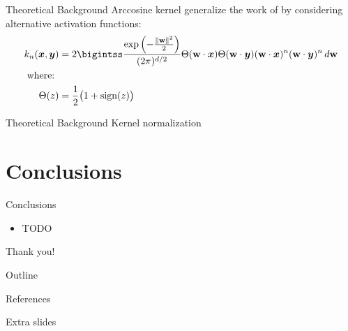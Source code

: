 \documentclass[aspectratio=169]{beamer}
\newcommand{\y}{{\boldsymbol{y}}}
\begin{document}
\begin{frame}{Theoretical Background \textendash{} Arccosine kernel}
	\textcite{choLargemarginClassificationInfinite2010} generalize the work of
	\textcite{williamsComputingInfiniteNetworks1996} by considering alternative activation functions:
	\begin{align*}
		k_n(\boldsymbol x, \y) & = 2 \bigintss \frac{\exp\left(-\frac{\lVert \textbf w \rVert^2}{2}\right)}{(2\pi)^{d/2}}
		\Theta(\textbf w \cdot \boldsymbol x) \Theta(\textbf w \cdot \y) (\textbf w \cdot \boldsymbol x)^n (\textbf w \cdot \y)^n \,d\textbf w \\
		\text{where: }                                                                                                                         \\
		\Theta(z)              & = \frac{1}{2} \bigl(1 + \text{sign}(z)\bigr)
	\end{align*}
\end{frame}

\begin{frame}{Theoretical Background \textendash{} Kernel normalization}
\end{frame}

\section{Conclusions}

\begin{frame}{Conclusions}
	\begin{itemize}%
		\item TODO
	\end{itemize}
\end{frame}

\begin{frame}[standout]
	Thank you!
\end{frame}

\begin{frame}{Outline}
	\vspace{1em}
	\tableofcontents
\end{frame}
\appendix

\begin{frame}[allowframebreaks]{References}
	\printbibliography[heading=none]
\end{frame}

\begin{frame}[standout]
	Extra slides
\end{frame}
\end{document}
